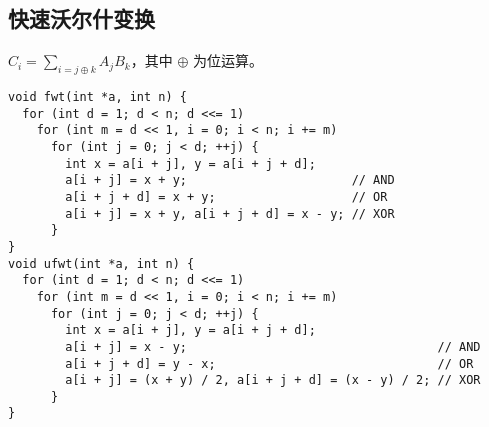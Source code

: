 \subsection{快速沃尔什变换}
$C_{i} = \sum_{i = j \oplus k}A_{j}B_{k}$，其中 $\oplus$ 为位运算。
\begin{lstlisting}
void fwt(int *a, int n) {
  for (int d = 1; d < n; d <<= 1)
    for (int m = d << 1, i = 0; i < n; i += m)
      for (int j = 0; j < d; ++j) {
        int x = a[i + j], y = a[i + j + d];
        a[i + j] = x + y;                       // AND
        a[i + j + d] = x + y;                   // OR
        a[i + j] = x + y, a[i + j + d] = x - y; // XOR
      }
}
void ufwt(int *a, int n) {
  for (int d = 1; d < n; d <<= 1)
    for (int m = d << 1, i = 0; i < n; i += m)
      for (int j = 0; j < d; ++j) {
        int x = a[i + j], y = a[i + j + d];
        a[i + j] = x - y;                                   // AND
        a[i + j + d] = y - x;                               // OR
        a[i + j] = (x + y) / 2, a[i + j + d] = (x - y) / 2; // XOR
      }
}
\end{lstlisting}